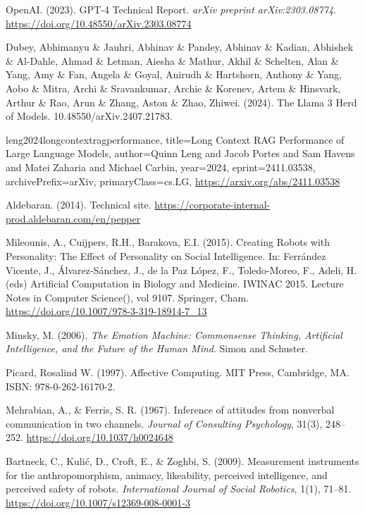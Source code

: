 \documentclass[runningheads]{llncs}
\begin{document}
\newpage
\begin{thebibliography}{20}

OpenAI. (2023). GPT-4 Technical Report. \emph{arXiv preprint arXiv:2303.08774}. \url{https://doi.org/10.48550/arXiv.2303.08774}

Dubey, Abhimanyu \& Jauhri, Abhinav \& Pandey, Abhinav \& Kadian, Abhishek \& Al-Dahle, Ahmad \& Letman, Aiesha \& Mathur, Akhil \& Schelten, Alan \& Yang, Amy \& Fan, Angela \& Goyal, Anirudh \& Hartshorn, Anthony \& Yang, Aobo \& Mitra, Archi \& Sravankumar, Archie \& Korenev, Artem \& Hinsvark, Arthur \& Rao, Arun \& Zhang, Aston \& Zhao, Zhiwei. (2024). The Llama 3 Herd of Models. 10.48550/arXiv.2407.21783. 

leng2024longcontextragperformance,
title={Long Context RAG Performance of Large Language Models}, 
author={Quinn Leng and Jacob Portes and Sam Havens and Matei Zaharia and Michael Carbin},
year={2024},
eprint={2411.03538},
archivePrefix={arXiv},
primaryClass={cs.LG},
\url{https://arxiv.org/abs/2411.03538}


Aldebaran. (2014). Technical site.
\url{https://corporate-internal-prod.aldebaran.com/en/pepper}

Mileounis, A., Cuijpers, R.H., Barakova, E.I. (2015). Creating Robots with Personality: The Effect of Personality on Social Intelligence. In: Ferrández Vicente, J., Álvarez-Sánchez, J., de la Paz López, F., Toledo-Moreo, F., Adeli, H. (eds) Artificial Computation in Biology and Medicine. IWINAC 2015. Lecture Notes in Computer Science(), vol 9107. Springer, Cham. \url{https://doi.org/10.1007/978-3-319-18914-7\_13}

Minsky, M. (2006). \emph{The Emotion Machine: Commonsense Thinking, Artificial Intelligence, and the Future of the Human Mind}. Simon and Schuster.

Picard, Rosalind W. (1997). Affective Computing. MIT Press, Cambridge, MA. ISBN: 978-0-262-16170-2.

Mehrabian, A., \& Ferris, S. R. (1967). Inference of attitudes from nonverbal communication in two channels. \emph{Journal of Consulting Psychology}, 31(3), 248–252. \url{https://doi.org/10.1037/h0024648}


Bartneck, C., Kuli\'{c}, D., Croft, E., \& Zoghbi, S. (2009). Measurement instruments for the anthropomorphism, animacy, likeability, perceived intelligence, and perceived safety of robots. \emph{International Journal of Social Robotics}, 1(1), 71–81. \url{https://doi.org/10.1007/s12369-008-0001-3}


\end{thebibliography}
\end{document}
